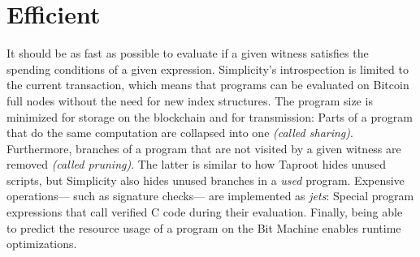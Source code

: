 \section{Efficient}

It should be as fast as possible to evaluate
if a given witness satisfies the spending conditions of a given expression.
Simplicity's introspection is limited to the current transaction,
which means that programs can be evaluated on Bitcoin full nodes without the need for new index structures.
%
The program size is minimized for storage on the blockchain and for transmission:
Parts of a program that do the same computation are collapsed into one \emph{(called sharing)}.
Furthermore,
branches of a program that are not visited by a given witness are removed \emph{(called pruning)}.
The latter is similar to how Taproot hides unused scripts,
but Simplicity also hides unused branches in a \emph{used} program.
%
Expensive operations---%
such as signature checks---%
are implemented as \emph{jets}:
Special program expressions that call verified C code during their evaluation.
%
Finally,
being able to predict the resource usage of a program on the Bit Machine
enables runtime optimizations.

